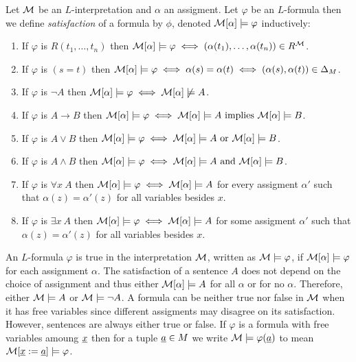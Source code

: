 \documentclass[12pt]{article}
\begin{document}
\begin{definition}
Let $\mathcal{M}$ be an $L$-interpretation and $\alpha$ an assigment. Let $\varphi$ be an $L$-formula then we define \textit{satisfaction} of a formula by $\phi$, denoted $\mathcal{M}[\alpha] \models \varphi$ inductively:
\begin{enumerate}
\item If $\varphi$ is $R(t_1, \dots, t_n)$ then $\mathcal{M}[\alpha] \models \varphi \iff (\alpha(t_1), \dots, \alpha(t_n)) \in R^{\mathcal{M}}$.
\item If $\varphi$ is $(s = t)$ then $\mathcal{M}[\alpha] \models \varphi \iff \alpha(s) = \alpha(t) \iff (\alpha(s), \alpha(t)) \in \Delta_M$. 
\item If $\varphi$ is $\neg A$ then $\mathcal{M}[\alpha] \models \varphi \iff \mathcal{M}[\alpha] \not\models A$.
\item If $\varphi$ is $A \to B$ then $\mathcal{M}[\alpha] \models \varphi \iff \mathcal{M}[\alpha] \models A \text{ implies } \mathcal{M}[\alpha] \models B$.
\item If $\varphi$ is $A \vee B$ then $\mathcal{M}[\alpha] \models \varphi \iff \mathcal{M}[\alpha] \models A \text{ or } \mathcal{M}[\alpha] \models B$.
\item If $\varphi$ is $A \wedge B$ then $\mathcal{M}[\alpha] \models \varphi \iff \mathcal{M}[\alpha] \models A \text{ and } \mathcal{M}[\alpha] \models B$.
\item If $\varphi$ is $\forall x \: A$ then $\mathcal{M}[\alpha] \models \varphi \iff \mathcal{M}[\alpha] \models A$ for every assigment $\alpha'$ such that $\alpha(z) = \alpha'(z)$ for all variables besides $x$.
\item If $\varphi$ is $\exists x \: A$ then $\mathcal{M}[\alpha] \models \varphi \iff \mathcal{M}[\alpha] \models A$ for some assigment $\alpha'$ such that $\alpha(z) = \alpha'(z)$ for all variables besides $x$.
\end{enumerate}
An $L$-formula $\varphi$ is true in the interpretation $\mathcal{M}$, written as $\mathcal{M} \models \varphi$, if $\mathcal{M}[\alpha] \models \varphi$ for each assignment $\alpha$. The satisfaction of a sentence $A$ does not depend on the choice of assignment and thus either $\mathcal{M}[\alpha] \models A$ for all $\alpha$ or for no $\alpha$. Therefore, either $\mathcal{M} \models A$ or $\mathcal{M} \models \neg A$. A formula can be neither true nor false in $\mathcal{M}$ when it has free variables since different assigments may disagree on its satisfaction. However, sentences are always either true or false. If $\varphi$ is a formula with free variables amoung $\underline{x}$ then for a tuple $\underline{a} \in M$ we write $\mathcal{M} \models \varphi(\underline{a})$ to mean $\mathcal{M}[\underline{x} := \underline{a}] \models \varphi$. 
\end{definition}
\end{document}
